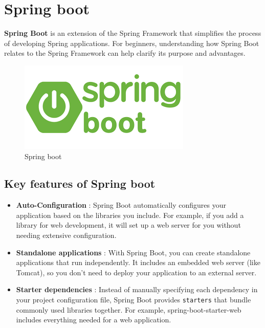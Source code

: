 \documentclass{article}
\begin{document}
\section{Spring boot}

\textbf{Spring Boot} is an extension of the Spring Framework that simplifies the process of developing Spring applications. For beginners, understanding how Spring Boot relates to the Spring Framework can help clarify its purpose and advantages.

\begin{figure}[H]
    \centering
    \begin{framed}
        \includegraphics[width=0.8\linewidth]{images/spring_boot_logo.png}
    \end{framed}
    \caption{Spring boot}
\end{figure}

\subsection{Key features of Spring boot} 
\begin{itemize}
    \item \textbf{Auto-Configuration} : Spring Boot automatically configures your application based on the libraries you include. For example, if you add a library for web development, it will set up a web server for you without needing extensive configuration.

    \item \textbf{Standalone applications} : 
    With Spring Boot, you can create standalone applications that run independently. It includes an embedded web server (like Tomcat), so you don’t need to deploy your application to an external server.

    \item \textbf{Starter dependencies} : Instead of manually specifying each dependency in your project configuration file, Spring Boot provides \texttt{starters} that bundle commonly used libraries together. For example, spring-boot-starter-web includes everything needed for a web application.

\end{itemize}
\end{document}
